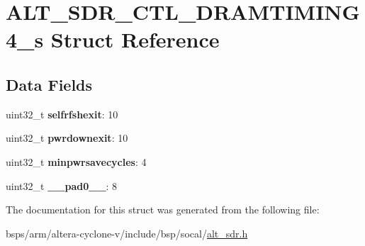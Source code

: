 \hypertarget{structALT__SDR__CTL__DRAMTIMING4__s}{}\section{A\+L\+T\+\_\+\+S\+D\+R\+\_\+\+C\+T\+L\+\_\+\+D\+R\+A\+M\+T\+I\+M\+I\+N\+G4\+\_\+s Struct Reference}
\label{structALT__SDR__CTL__DRAMTIMING4__s}
\subsection*{Data Fields}
\begin{DoxyCompactItemize}
\item 
\mbox{\label{structALT__SDR__CTL__DRAMTIMING4__s_a056bec456995908a9b334bd46183261b}} 
uint32\+\_\+t {\bfseries selfrfshexit}\+: 10
\item 
\mbox{\label{structALT__SDR__CTL__DRAMTIMING4__s_ae28edda956c2722b7fe5dbe871411d8e}} 
uint32\+\_\+t {\bfseries pwrdownexit}\+: 10
\item 
\mbox{\label{structALT__SDR__CTL__DRAMTIMING4__s_a8487d496a8625dc87ddb6f5fc0b325fc}} 
uint32\+\_\+t {\bfseries minpwrsavecycles}\+: 4
\item 
\mbox{\label{structALT__SDR__CTL__DRAMTIMING4__s_affce0e01a2f5a33002cc432fed9ff9eb}} 
uint32\+\_\+t {\bfseries \+\_\+\+\_\+pad0\+\_\+\+\_\+}\+: 8
\end{DoxyCompactItemize}


The documentation for this struct was generated from the following file\+:\begin{DoxyCompactItemize}
\item 
bsps/arm/altera-\/cyclone-\/v/include/bsp/socal/\mbox{\hyperlink{alt__sdr_8h}{alt\+\_\+sdr.\+h}}\end{DoxyCompactItemize}
